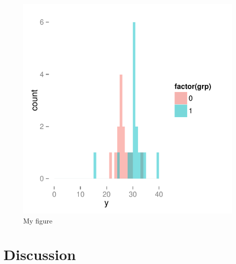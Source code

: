 \documentclass{article}\usepackage{knitr}
\begin{document}
\begin{figure}[H]
  \includegraphics{output/plot.pdf}
  \caption{My figure}
  \label{fig}
\end{figure}


\section{Discussion}






\end{document}
